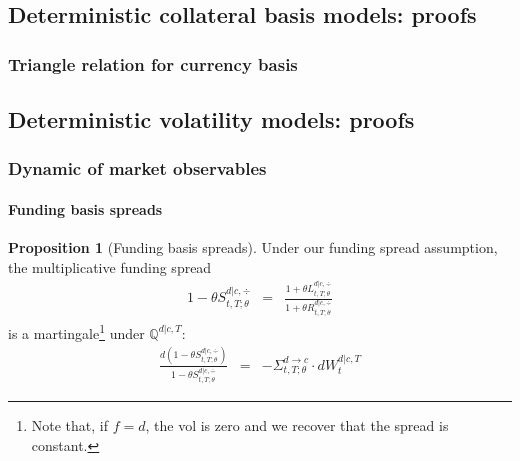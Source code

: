 \documentclass[11pt,english]{amsart}
\newcommand{\QQ}{\mathbb{Q}}
\theoremstyle{definition}
\newtheorem*{prop*}{Proposition}
\begin{document}
\subsection{Deterministic collateral basis models: proofs}%


\subsubsection{Triangle relation for currency basis}%


\subsection{Deterministic volatility models: proofs}%

\subsubsection{Dynamic of market observables}

\paragraph{Funding basis spreads}

\begin{prop*}[Funding basis spreads]
Under our funding spread assumption, the multiplicative funding spread
\begin{eqnarray}
	1 - \theta S^{d|c,\div}_{t,T;\theta}
	&=&  \frac{1+\theta L^{d|c,\div}_{t,T;\theta}}{1+\theta R^{d|c,\div}_{t,T;\theta}} 
\end{eqnarray} 
is a martingale\footnote{Note that, if $f=d$, the vol is zero and we recover that the spread is constant.}
under $\QQ^{d|c,T}$:
\begin{eqnarray}
  \frac{d(1 - \theta S^{d|c,\div}_{t,T;\theta})}{1 - \theta S^{d|c,\div}_{t,T;\theta}} 	
  &=& -\Sigma^{d\to c}_{t,T;\theta} \cdot dW^{d|c,T}_t 
\end{eqnarray} 
\end{prop*}
\end{document}
